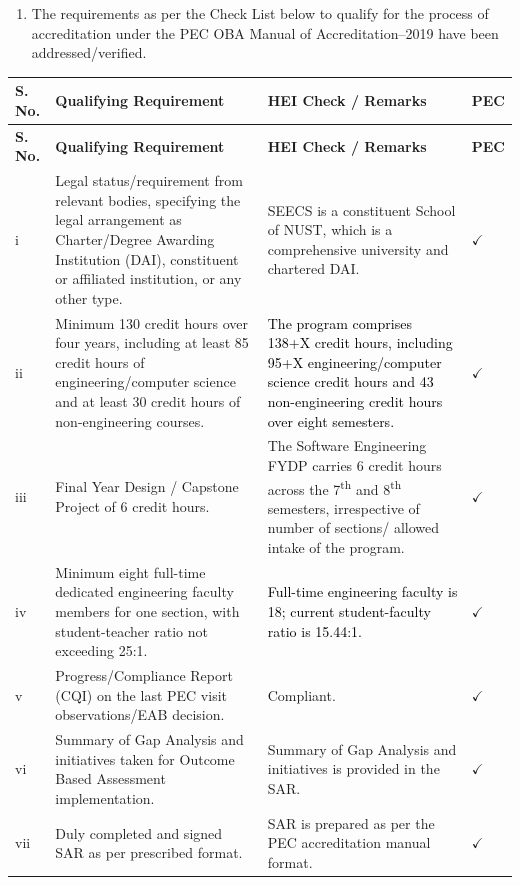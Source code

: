 \documentclass[12pt, a4paper]{report}
\renewcommand{\arraystretch}{1.25}
\begin{document}
\begin{enumerate}
\item The requirements as per the Check List below to qualify for the process of accreditation under the PEC OBA Manual of Accreditation--2019 have been addressed/verified.
\end{enumerate}

\bigskip
{} %

\begingroup
\footnotesize
\setlength{\tabcolsep}{5pt}
\renewcommand{\arraystretch}{1.18}
\begin{longtable}{@{}>{\centering\arraybackslash}p{}p{}p{}>{\centering\arraybackslash}p{}@{}}
\toprule
\textbf{S. No.} & \textbf{Qualifying Requirement} & \textbf{HEI Check / Remarks} & \textbf{PEC} \\
\midrule
\endfirsthead
\toprule
\textbf{S. No.} & \textbf{Qualifying Requirement} & \textbf{HEI Check / Remarks} & \textbf{PEC} \\
\midrule
\endhead
\bottomrule
\endfoot
i & Legal status/requirement from relevant bodies, specifying the legal arrangement as Charter/Degree Awarding Institution (DAI), constituent or affiliated institution, or any other type. & SEECS is a constituent School of NUST, which is a comprehensive university and chartered DAI. & $\checkmark$ \\
\addlinespace[2pt]
ii & Minimum 130 credit hours over four years, including at least 85 credit hours of engineering/computer science and at least 30 credit hours of non-engineering courses. & \textcolor {black}{The program comprises 138+X credit hours, including 95+X engineering/computer science credit hours and 43 non-engineering credit hours over eight semesters.} & $\checkmark$ \\
\addlinespace[2pt]
iii & Final Year Design / Capstone Project of 6 credit hours. & The Software Engineering FYDP carries 6 credit hours across the 7\textsuperscript{th} and 8\textsuperscript{th} semesters, irrespective of number of sections/ allowed
intake of the program.& $\checkmark$ \\
\addlinespace[2pt]
iv & Minimum eight full-time dedicated engineering faculty members for one section, with student-teacher ratio not exceeding 25:1. & \textcolor {black}{Full-time engineering faculty is 18; current student-faculty ratio is 15.44:1.} & $\checkmark$ \\
\addlinespace[2pt]
v & Progress/Compliance Report (CQI) on the last PEC visit observations/EAB decision. & Compliant. & $\checkmark$ \\
\addlinespace[2pt]
vi & Summary of Gap Analysis and initiatives taken for Outcome Based Assessment implementation. & Summary of Gap Analysis and initiatives is provided in the SAR. & $\checkmark$ \\
\addlinespace[2pt]
vii & Duly completed and signed SAR as per prescribed format. & SAR is prepared as per the PEC accreditation manual format. & $\checkmark$ \\
\end{longtable}
\endgroup
\end{document}

